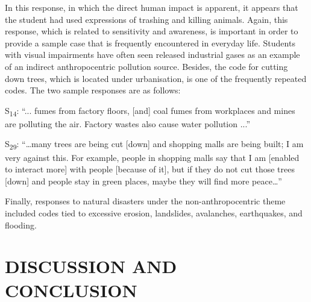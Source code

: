 \documentclass[11.5pt]{sig-alternate} %
\begin{document}
\begin{large}
In this response, in which the direct human impact is apparent, it appears that the student had used expressions of trashing and killing animals. Again, this response, which is related to sensitivity and awareness, is important in order to provide a sample case that is frequently encountered in everyday life. Students with visual impairments have often seen released industrial gases as an example of an indirect anthropocentric pollution source. Besides, the code for cutting down trees, which is located under urbanisation, is one of the frequently repeated codes. The two sample responses are as follows:

S\textsubscript{14}: “... fumes from factory floors, [and] coal fumes from workplaces and mines are polluting the air. Factory wastes also cause water pollution ...”

S\textsubscript{29}: “…many trees are being cut [down] and shopping malls are being built; I am very against this. For example, people in shopping malls say that I am [enabled to interact more] with people [because of it], but if they do not cut those trees [down] and people stay in green places, maybe they will find more peace…”

Finally, responses to natural disasters under the non-anthropocentric theme included codes tied to excessive erosion, landslides, avalanches, earthquakes, and flooding. 

\section*{DISCUSSION AND CONCLUSION}


\end{large}
\end{document}
